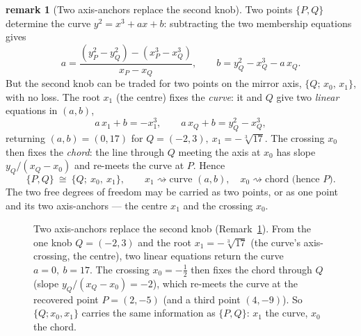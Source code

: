 \documentclass[11pt]{article}
\theoremstyle{definition}
\newtheorem{remark}{remark}
\begin{document}
\begin{remark}[Two axis-anchors replace the second knob]\label{rem:axisanchors}
Two points $\{P,Q\}$ determine the curve $y^{2}=x^{3}+ax+b$: subtracting the two
membership equations gives
\[
  a=\frac{(y_P^{2}-y_Q^{2})-(x_P^{3}-x_Q^{3})}{x_P-x_Q},\qquad
  b=y_Q^{2}-x_Q^{3}-a\,x_Q .
\]
But the second knob can be traded for two points on the mirror axis,
$\{Q;\,x_0,\,x_1\}$, with no loss. The root $x_1$ (the centre) fixes the \emph{curve}:
it and $Q$ give two \emph{linear} equations in $(a,b)$,
\[
  a\,x_1+b=-x_1^{3},\qquad a\,x_Q+b=y_Q^{2}-x_Q^{3},
\]
returning $(a,b)=(0,17)$ for $Q=(-2,3),\ x_1=-\sqrt[3]{17}$. The crossing $x_0$ then
fixes the \emph{chord}: the line through $Q$ meeting the axis at $x_0$ has slope
$y_Q/(x_Q-x_0)$ and re-meets the curve at $P$. Hence
\[
  \{P,Q\}\ \cong\ \{Q;\ x_0,\ x_1\},\qquad
  x_1\rightsquigarrow\text{curve } (a,b),\quad x_0\rightsquigarrow\text{chord (hence }P).
\]
The two free degrees of freedom may be carried as two points, or as one point and its
two axis-anchors --- the centre $x_1$ and the crossing $x_0$.
\end{remark}

\begin{figure}[htbp]
\centering
{}
\caption{Two axis-anchors replace the second knob (Remark~\ref{rem:axisanchors}). From the
one knob $Q=(-2,3)$ and the root $x_1=-\sqrt[3]{17}$ (the curve's axis-crossing, the
centre), two linear equations return the curve $a=0,\ b=17$. The crossing $x_0=-\tfrac12$
then fixes the chord through $Q$ (slope $y_Q/(x_Q-x_0)=-2$), which re-meets the curve at
the recovered point $P=(2,-5)$ (and a third point $(4,-9)$). So $\{Q;x_0,x_1\}$ carries
the same information as $\{P,Q\}$: $x_1$ the curve, $x_0$ the chord.}
\label{fig:axisanchors}
\end{figure}
\end{document}
